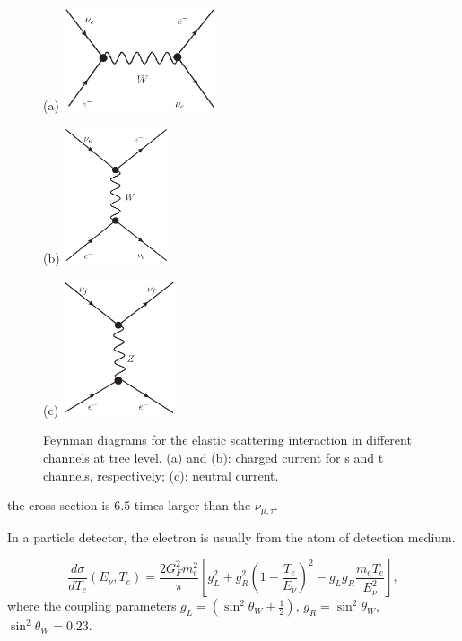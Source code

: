 \begin{figure}[htbp]
	\centering
	\begin{minipage}[t]{0.45\textwidth}{(a)}
		\centering
		\includegraphics[width=4.5cm]{charged-1.eps}
	\end{minipage}
	\begin{minipage}[t]{0.3\textwidth}{(b)}
		\centering
		\includegraphics[height=4cm]{charged.eps}
	\end{minipage}
	\begin{minipage}[t]{0.4\textwidth}{(c)}
		\centering
		\includegraphics[height=4cm]{neutral.eps}
	\end{minipage}
	\caption[Feynman diagrams for the elastic scattering interaction in different channels at tree level.]{Feynman diagrams for the elastic scattering interaction in different channels at tree level. (a) and (b): charged current for s and t channels, respectively; (c): neutral current.}
	\label{fig:feynman-es}
\end{figure}



the cross-section is 6.5 times larger than the $\nu_{\mu,\tau}$.


In a particle detector, the electron is usually from the atom of detection medium. 

\begin{equation}
\frac{d\sigma}{dT_e}(E_\nu,T_e)=\frac{2G_F^2m^2_e}{\pi}\left[g_L^2+g_R^2\left(1-\frac{T_e}{E_\nu}\right)^2-g_Lg_R\frac{m_eT_e}{E_\nu^2}\right],
\end{equation}
where the coupling parameters $g_L=(\sin^2\theta_W\pm\frac{1}{2})$, $g_R=\sin^2\theta_W$, $\sin^2\theta_W=0.23$.

